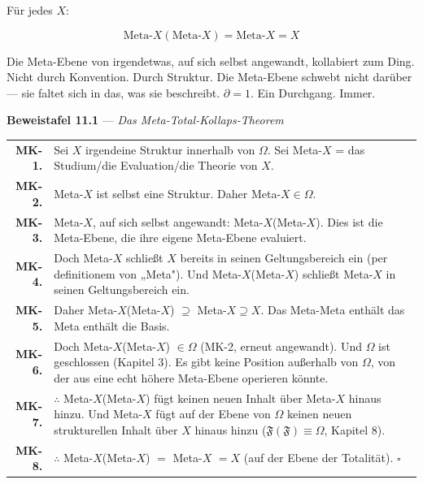 \documentclass[10pt, openany, oneside]{book}
\renewcommand{\footnotesize}{\fontsize{8.5}{11}\selectfont}
\begin{document}
\vspace{2em}


\noindent Für jedes $X$:

$$\text{Meta-}X(\text{Meta-}X) = \text{Meta-}X = X$$

Die Meta-Ebene von irgendetwas, auf sich selbst angewandt, kollabiert zum Ding. Nicht durch Konvention. Durch Struktur. Die Meta-Ebene schwebt nicht darüber --- sie faltet sich in das, was sie beschreibt. $\partial = 1$. Ein Durchgang. Immer.

\vspace{0.5em}

\textbf{Beweistafel 11.1} --- \textit{Das Meta-Total-Kollaps-Theorem}

\vspace{0.5em}

{\footnotesize
\noindent\begin{tabular}{r p{}}
\textbf{MK-1.} & Sei $X$ irgendeine Struktur innerhalb von $\Omega$. Sei Meta-$X$ = das Studium/die Evaluation/die Theorie von $X$. \\[0.3em]
\textbf{MK-2.} & Meta-$X$ ist selbst eine Struktur. Daher Meta-$X \in \Omega$. \\[0.3em]
\textbf{MK-3.} & Meta-$X$, auf sich selbst angewandt: Meta-$X$(Meta-$X$). Dies ist die Meta-Ebene, die ihre eigene Meta-Ebene evaluiert. \\[0.3em]
\textbf{MK-4.} & Doch Meta-$X$ schließt $X$ bereits in seinen Geltungsbereich ein (per definitionem von „Meta"). Und Meta-$X$(Meta-$X$) schließt Meta-$X$ in seinen Geltungsbereich ein. \\[0.3em]
\textbf{MK-5.} & Daher Meta-$X$(Meta-$X$) $\supseteq$ Meta-$X \supseteq X$. Das Meta-Meta enthält das Meta enthält die Basis. \\[0.3em]
\textbf{MK-6.} & Doch Meta-$X$(Meta-$X$) $\in \Omega$ (MK-2, erneut angewandt). Und $\Omega$ ist geschlossen (Kapitel 3). Es gibt keine Position außerhalb von $\Omega$, von der aus eine echt höhere Meta-Ebene operieren könnte. \\[0.3em]
\textbf{MK-7.} & $\therefore$ Meta-$X$(Meta-$X$) fügt keinen neuen Inhalt über Meta-$X$ hinaus hinzu. Und Meta-$X$ fügt auf der Ebene von $\Omega$ keinen neuen strukturellen Inhalt über $X$ hinaus hinzu ($\mathfrak{F}(\mathfrak{F}) \equiv \Omega$, Kapitel 8). \\[0.3em]
\textbf{MK-8.} & $\therefore$ Meta-$X$(Meta-$X$) $=$ Meta-$X$ $= X$ (auf der Ebene der Totalität). $\square$ \\[0.3em]
\end{tabular}
}
\end{document}
